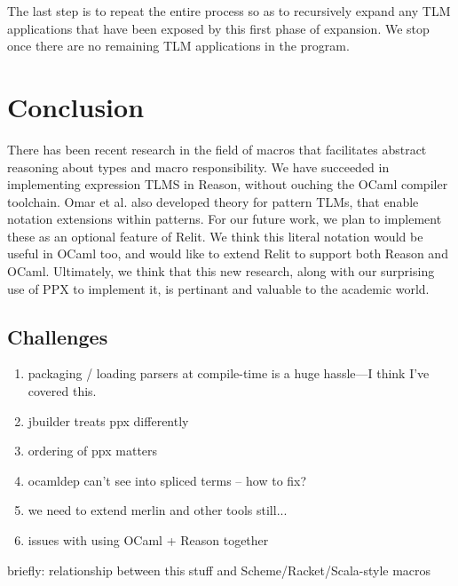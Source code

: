 \documentclass[acmsmall,review]{acmart}
\theoremstyle{slplain}
\numberwithin{thm}{section}
\begin{document}
The last step is to repeat the entire process so as to recursively expand any TLM applications that have been exposed by this first phase of expansion. We stop once there are no remaining TLM applications in the program.

\section{Conclusion}

There has been recent research in the field of macros that facilitates abstract reasoning about types and macro responsibility. We have succeeded in implementing expression TLMS in Reason, without ouching the OCaml compiler toolchain. Omar et al. also developed theory for pattern TLMs, that enable notation extensions within patterns. For our future work, we plan to implement these as an optional feature of Relit. We think this literal notation would be useful in OCaml too, and would like to extend Relit to support both Reason and OCaml. Ultimately, we think that this new research, along with our surprising use of PPX to implement it, is pertinant and valuable to the academic world.

\subsection{Challenges}
\begin{enumerate}
  \item packaging / loading parsers at compile-time is a huge hassle---I think I've covered this.
  \item jbuilder treats ppx differently
  \item ordering of ppx matters
  \item ocamldep can't see into spliced terms -- how to fix?
  \item we need to extend merlin and other tools still...
  \item issues with using OCaml + Reason together
\end{enumerate}

briefly: relationship between this stuff and Scheme/Racket/Scala-style macros



% 
\end{document}
